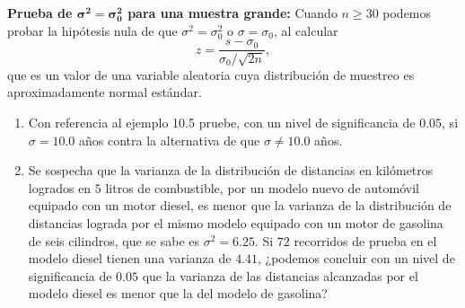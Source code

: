 \begin{enunciado}
 \textbf{Prueba de $\mathbf{\sigma^2 = \sigma_0^2}$ para una muestra grande:}
 Cuando $n \geq 30$ podemos probar la hip\'otesis nula de que $\sigma^2=\sigma_0^2$
 o $\sigma = \sigma_0$, al calcular
 \begin{equation*}
  z = \frac{s - \sigma_0}{\sigma_0/\sqrt{2n}},
 \end{equation*}
 que es un valor de una variable aleatoria
 cuya distribuci\'on de muestreo es aproximadamente normal est\'andar.
 \begin{enumerate}
  \item Con referencia al ejemplo 10.5 pruebe,
  con un nivel de significancia de $0.05$, si $\sigma = 10.0$ a\~nos
  contra la alternativa de que $\sigma \neq 10.0$ a\~nos.
  
  \item Se sospecha que la varianza de la distribuci\'on de distancias
  en kil\'ometros logrados en $5$ litros de combustible, por un modelo nuevo
  de autom\'ovil equipado con un motor diesel, es menor que la varianza
  de la distribuci\'on de distancias lograda por el mismo modelo equipado
  con un motor de gasolina de seis cilindros, que se sabe es $\sigma^2 = 6.25$.
  Si $72$ recorridos de prueba en el modelo diesel tienen una varianza de $4.41$,
  ¿podemos concluir con un nivel de significancia de $0.05$
  que la varianza de las distancias alcanzadas por el modelo diesel es menor
  que la del modelo de gasolina?
 \end{enumerate}
\end{enunciado}

